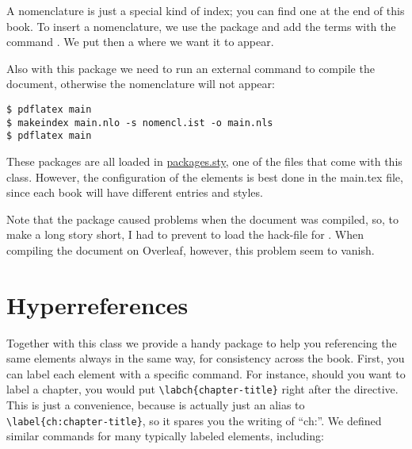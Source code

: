 A nomenclature is just a special kind of index; you can find one at the end of
this book. To insert a nomenclature, we use the package  and
add the terms with the command . We put then a
 where we want it to appear.

Also with this package we need to run an external command to compile the 
document, otherwise the nomenclature will not appear:

\begin{lstlisting}[style=kaolstplain]
$ pdflatex main
$ makeindex main.nlo -s nomencl.ist -o main.nls
$ pdflatex main
\end{lstlisting}

These packages are all loaded in 
\href{style/packages.sty}{packages.sty}, one of the files that come with 
this class. However, the configuration of the elements is best done in 
the main.tex file, since each book will have different entries and 
styles.

Note that the  package caused problems when the 
document was compiled, so, to make a long story short, I had to prevent 
 to load the hack-file for . When 
compiling the document on Overleaf, however, this problem seem to 
vanish.


\section{Hyperreferences}

Together with this class we provide a handy package to help you 
referencing the same elements always in the same way, for consistency 
across the book. First, you can label each element with a specific 
command. For instance, should you want to label a chapter, you would put 
\lstinline|\labch{chapter-title}| right after the  
directive. This is just a convenience, because  is
actually just an alias to \lstinline|\label{ch:chapter-title}|, so it 
spares you the writing of \enquote{ch:}. We defined similar commands for 
many typically labeled elements, including:

